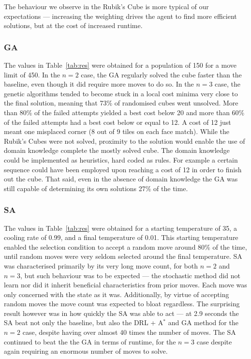 \documentclass[UKenglish]{svproc}
\begin{document}
The behaviour we observe in the Rubik's Cube is more typical of our expectations --- increasing the weighting drives the agent to find more efficient solutions, but at the cost of increased runtime.

\subsubsection{GA}
The values in Table~\ref{tab:res} were obtained for a population of 150 for a move limit of 450.
In the $n=2$ case, the GA regularly solved the cube faster than the baseline, even though it did require more moves to do so. In the $n=3$ case, the genetic algorithms tended to become stuck in a local cost minima very close to the final solution, meaning that 73\% of randomised cubes went unsolved. More than 80\% of the failed attempts yielded a best cost below 20 and more than 60\% of the failed attempts had a best cost below or equal to 12. A cost of 12 just meant one misplaced corner (8 out of 9 tiles on each face match).
While the Rubik's Cubes were not solved, proximity to the solution would enable the use of domain knowledge complete the mostly solved cube. The domain knowledge could be implemented as heuristics, hard coded as rules. For example a certain sequence could have been employed upon reaching a cost of 12 in order to finish out the cube. That said, even in the absence of domain knowledge the GA was still capable of determining its own solutions 27\% of the time.

\subsubsection{SA}
The values in Table~\ref{tab:res} were obtained for a starting temperature of 35, a cooling rate of 0.99, and a final temperature of 0.01. This starting temperature enabled the selection condition to accept a random move around 80\% of the time, until random moves were very seldom selected around the final temperature.
SA was characterised primarily by its very long move count, for both $n=2$ and $n=3$, but such behaviour was to be expected --- the stochastic method did not learn nor did it inherit beneficial characteristics from prior moves. Each move was only concerned with the state as it was. Additionally, by virtue of accepting random moves the move count was expected to bloat regardless. The surprising result however was in how quickly the SA was able to act --- at 2.9 seconds the SA beat not only the baseline, but also the DRL + A$^{\ast}$ and GA method for the $n=2$ case, despite having over almost 40 times the number of moves. The SA continued to beat the the GA in terms of runtime, for the $n=3$ case despite again requiring an enormous number of moves to solve.
\end{document}
